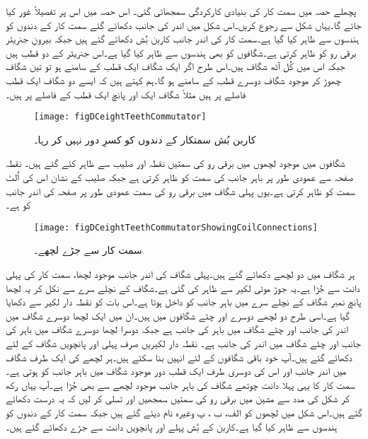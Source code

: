 پچھلے حصہ میں سمت کار کی بنیادی کارکردگی سمجھائی گئی۔ اس حصہ میں اس پر تفصیلاً غور کیا جائے گا۔یہاں شکل   سے رجوع کریں۔اس شکل میں اندر کی جانب دکھائے گئے سمت کار کے دندوں کو ہندسوں سے ظاہر کیا گیا ہے۔سمت کار کی اندر جانب کاربن بُش دکھائے گئے ہیں جبکہ  بیرونِ جنریٹر برقی رو کو ظاہر کرتی ہے۔شگافوں کو بھی ہندسوں سے ظاہر کیا گیا ہے۔اس جنریٹر کے دو قطب ہیں جبکہ اس میں کُل آٹھ شگاف ہیں۔اس طرح اگر ایک شگاف ایک قطب کے سامنے ہو تو تین شگاف چھوڑ کر موجود شگاف دوسرے قطب کے سامنے ہو گا۔ہم کہتے ہیں کہ ایسے دو شگاف ایک قطب فاصلے پر ہیں مثلاً شگاف ایک اور پانچ ایک قطب کے فاصلے پر ہیں۔
\begin{figure}
\centering
\texttt{[image: figDCeightTeethCommutator]}
\caption{کاربن بُش سمتکار کے دندوں کو کسرِ دور نہیں کر رہا۔}
\label{شکل_یکسمتی_سمتکار_بش_کسر_دور_نہیں_کر_رہا}
\end{figure}

شگافوں میں موجود لچھوں میں برقی رو کی سمتیں نقطہ اور صلیب سے ظاہر کئے گئے ہیں۔ نقطہ صفحہ سے عمودی طور پر باہر جانب کی سمت کو ظاہر کرتی ہے جبکہ صلیب کے نشان اس کی اُلٹ سمت کو ظاہر کرتی ہے۔یوں پہلی شگاف میں برقی رو کی سمت عمودی طور پر صفحہ کی اندر جانب کو ہے۔
\begin{figure}
\centering
\texttt{[image: figDCeightTeethCommutatorShowingCoilConnections]}
\caption{سمت کار سے جڑے لچھے۔}
\label{شکل_یکسمتی_سمتکار_سے_جڑے_لچھے}
\end{figure}

ہر شگاف میں دو لچھے دکھائے گئے ہیں۔پہلی شگاف کی اندر جانب موجود لچھا، سمت کار کی پہلی دانت سے جُڑا ہے۔یہ جوڑ موٹی لکیر سے ظاہر کی گئی ہے۔شگاف کے نچلے سرے سے نکل کر یہ لچھا پانچ نمبر شگاف کے نچلے سرے میں باہر جانب کو داخل ہوتا ہے۔اس بات کو نقطہ دار لکیر سے دکھایا گیا ہے۔اسی طرح دو لچھے دوسرے اور چٹے شگافوں میں ہیں۔ان میں ایک لچھا دوسرے شگاف میں اندر کی جانب اور چٹے شگاف میں باہر کی جانب ہے جبکہ دوسرا لچھا دوسرے شگاف میں باہر کی جانب اور چٹے شگاف میں اندر کی جانب ہے۔ نقطہ دار لکیریں صرف پہلی اور پانچویں شگاف کے لئے دکھائے گئے ہیں۔آپ خود باقی شگافوں کے لئے انہیں بنا سکتے ہیں۔ہر لچھے کی ایک طرف شگاف میں اندر جانب  اور اس کی دوسری طرف ایک قطب دور موجود شگاف میں باہر جانب کو ہوتی ہے۔سمت کار کا یہی پہلا دانت چوتھے شگاف کی باہر جانب موجود لچھے سے بھی جُڑا ہے۔آپ یہاں رکھ کر شکل   کی مدد سے مشین میں برقی رو کی سمتیں سمجھیں اور تسلی کر لیں کہ یہ درست دکھائے گئے ہیں۔اس شکل میں لچھوں کو الف، ب ، پ وغیرہ نام دیئے گئے ہیں جبکہ سمت کار کے دندوں کو ہندسوں سے ظاہر کیا گیا ہے۔کاربن کے بُش پہلے اور پانچویں دانت سے جڑے دکھائے گئے ہیں۔

